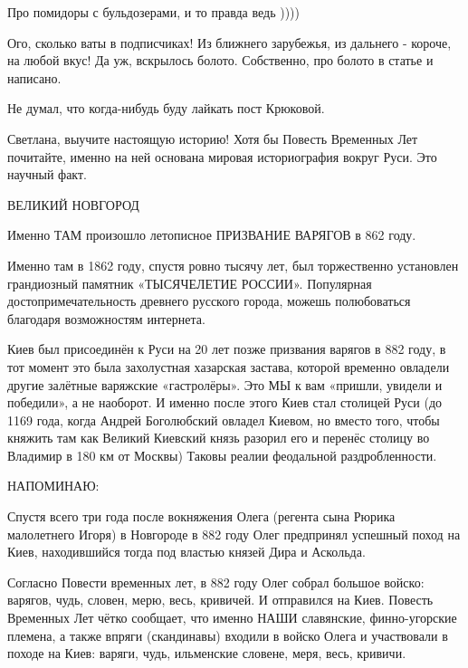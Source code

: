 \begin{itemize}
Про помидоры с бульдозерами, и то правда ведь ))))

 

Ого, сколько ваты в подписчиках! Из ближнего зарубежья, из дальнего - короче,
на любой вкус! Да уж, вскрылось болото. Собственно, про болото в статье и
написано.

Не думал, что когда-нибудь буду лайкать пост Крюковой.


 

Светлана, выучите настоящую историю! Хотя бы Повесть Временных Лет почитайте,
именно на ней основана мировая историография вокруг Руси. Это научный факт.

ВЕЛИКИЙ НОВГОРОД

Именно ТАМ произошло летописное ПРИЗВАНИЕ ВАРЯГОВ в 862 году.

Именно там в 1862 году, спустя ровно тысячу лет, был торжественно установлен
грандиозный памятник «ТЫСЯЧЕЛЕТИЕ РОССИИ». Популярная достопримечательность
древнего русского города, можешь полюбоваться благодаря возможностям интернета.

Киев был присоединён к Руси на 20 лет позже призвания варягов в 882 году, в тот
момент это была захолустная хазарская застава, которой временно овладели другие
залётные варяжские «гастролёры». Это МЫ к вам «пришли, увидели и победили», а
не наоборот. И именно после этого Киев стал столицей Руси (до 1169 года, когда
Андрей Боголюбский овладел Киевом, но вместо того, чтобы княжить там как
Великий Киевский князь разорил его и перенёс столицу во Владимир в 180 км от
Москвы) Таковы реалии феодальной раздробленности.

НАПОМИНАЮ:

Спустя всего три года после вокняжения Олега (регента сына Рюрика малолетнего
Игоря) в Новгороде в 882 году Олег предпринял успешный поход на Киев,
находившийся тогда под властью князей Дира и Аскольда.

Согласно Повести временных лет, в 882 году Олег собрал большое войско: варягов,
чудь, словен, мерю, весь, кривичей. И отправился на Киев. Повесть Временных Лет
чётко сообщает, что именно НАШИ славянские, финно-угорские племена, а также
впряги (скандинавы) входили в войско Олега и участвовали в походе на Киев:
варяги, чудь, ильменские словене, меря, весь, кривичи.


\end{itemize}
